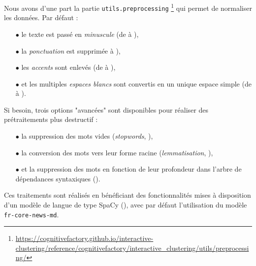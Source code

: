 	Nous avons d'une part la partie \texttt{utils.preprocessing} \footnote{
		\url{https://cognitivefactory.github.io/interactive-clustering/reference/cognitivefactory/interactive_clustering/utils/preprocessing/}
	} qui permet de normaliser les données.
	Par défaut :
	\begin{itemize}
		\item[\(\bullet\)] le texte est passé en \textit{minuscule} (de  à ),
		\item[\(\bullet\)] la \textit{ponctuation} est supprimée  à ), %
		\item[\(\bullet\)] les \textit{accents} sont enlevés (de  à ),
		\item[\(\bullet\)] et les multiples \textit{espaces blancs} sont convertis en un unique espace simple (de  à ).
	\end{itemize}
	
	Si besoin, trois options "avancées" sont disponibles pour réaliser des prétraitements plus destructif :
	\begin{itemize}
		\item[\(\bullet\)] la suppression des mots vides (\textit{stopwords}, \cite{nothman-etal:2018:stop-word-lists}),
		\item[\(\bullet\)] la conversion des mots vers leur forme racine (\textit{lemmatisation}, \cite{manning-schutze:2000:foundations-statistical-natural}),
		\item[\(\bullet\)] et la suppression des mots en fonction de leur profondeur dans l'arbre de dépendances syntaxiques (\cite{nivre:2006:inductive-dependency-parsing}).
	\end{itemize}
	
	Ces traitements sont réalisés en bénéficiant des fonctionnalités mises à disposition d'un modèle de langue de type SpaCy (\cite{honnibal-montani:2017:spacy-natural-language}), avec par défaut l'utilisation du modèle \texttt{fr-core-news-md}.
	
